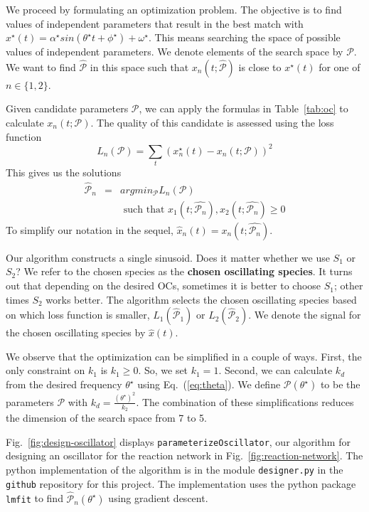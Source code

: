 \documentclass{bmcart}
\newcommand{\eqn}[1]{Eq.~(\ref{#1})}
\newcommand{\fig}[1]{Fig.~\ref{#1}}
\newcommand{\tab}[1]{Table~\ref{#1}}
\begin{document}
We proceed by formulating an optimization problem. The objective is to find values of independent parameters that result in the best match with
$x^{\star}(t) = \alpha^{\star} sin(\theta^{\star} t + \phi^{\star}) + \omega^{\star}$. This means searching the space of possible values of independent parameters. We denote elements of the search space by $\mathcal{P}$. We want to find $\hat{\mathcal{P}}$ in this space such that $x_n(t; \hat{\mathcal{P}})$ is close to $x^{\star}(t)$ for one of $n \in \{1, 2\}.$

Given candidate parameters $\mathcal{P}$, we can apply the formulas in \tab{tab:oc} to calculate $x_n(t; \mathcal{P}).$ The quality of this candidate is assessed using the loss function
\begin{equation}
L_n (\mathcal{P}) = \sum_t \left( x^{\star}_n(t) -x_n(t; \mathcal{P}) \right)^2
\label{eq:loss}
\end{equation}
This gives us the solutions
\begin{eqnarray*}
    \hat{\mathcal{P}}_n & = & argmin_{\mathcal{P}} L_n
    (\mathcal{P}) \\
    & & \text{ such that } x_1 (t; \hat{\mathcal{P}_n}), x_2(t; \hat{\mathcal{P}_n}) \geq 0
\end{eqnarray*}
To simplify our notation in the sequel, $\hat{x}_n (t) = x_n(t; \hat{\mathcal{P}_n}).$

Our algorithm constructs a single sinusoid. Does it matter whether we use $S_1$ or $S_2$? We refer to the chosen species as the {\bf chosen oscillating species}. It turns out that depending on the desired OCs, sometimes it is better to choose $S_1$; other times $S_2$ works better. The algorithm selects the chosen oscillating species based on which loss function is smaller, $L_1 (\hat{\mathcal{P}}_1)$ or $L_2 (\hat{\mathcal{P}}_2)$. We denote the signal for the chosen oscillating species by $\hat{x} (t).$

We observe that the optimization can be simplified in a couple of ways. First, the only constraint on $k_1$ is $k_1 \geq 0.$ So, we set $k_1 = 1$. Second, we can calculate $k_d$ from the desired frequency $\theta^{\star}$ using \eqn{eq:theta}. We define $\mathcal{P}(\theta^{\star})$ to be the parameters $\mathcal{P}$ with
$k_d = \frac{(\theta^{\star})^2}{k_2}$. The combination of these simplifications reduces the dimension of the search space from 7 to 5.

\fig{fig:design-oscillator} displays {\tt parameterizeOscillator}, our algorithm for designing an oscillator for the reaction network in \fig{fig:reaction-network}. The python implementation of the algorithm is in the module {\tt designer.py} in the {\tt github} repository for this project. The implementation uses the python package {\tt lmfit} to find {$\hat{\mathcal{P}}_n (\theta^{\star})$} using gradient descent.
\end{document}
